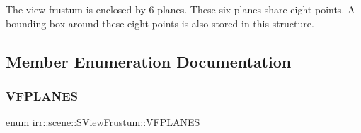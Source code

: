 The view frustum is enclosed by 6 planes. These six planes share eight points. A bounding box around these eight points is also stored in this structure. 

\subsection{Member Enumeration Documentation}
\mbox{\label{structirr_1_1scene_1_1SViewFrustum_ae3a96797aec028717f0589e82926b9f0}} 
\subsubsection{\texorpdfstring{V\+F\+P\+L\+A\+N\+ES}{VFPLANES}\hspace{0.1cm}{\footnotesize\ttfamily [1/2]}}
{\footnotesize\ttfamily enum \hyperlink{structirr_1_1scene_1_1SViewFrustum_ae3a96797aec028717f0589e82926b9f0}{irr\+::scene\+::\+S\+View\+Frustum\+::\+V\+F\+P\+L\+A\+N\+ES}}

